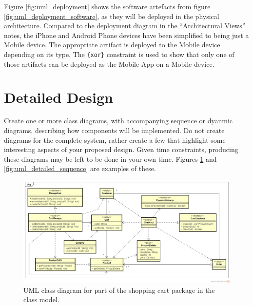 \documentclass{csse4400}
\begin{document}
\noindent
Figure \ref{fig:uml_deployment} shows the software artefacts from figure \ref{fig:uml_deployment_software},
as they will be deployed in the physical architecture.
Compared to the deployment diagram in the ``Architectural Views'' notes,
the iPhone and Android Phone devices have been simplified to being just a Mobile device.
The appropriate artifact is deployed to the Mobile device depending on its type.
The \texttt{\{xor\}} constraint is used to show that only one of those artifacts can be deployed as the Mobile App on a Mobile device.



\filbreak\newpage
\section{Detailed Design}
Create one or more class diagrams, with accompanying sequence or dyanmic diagrams, describing how components will be implemented.
Do not create diagrams for the complete system, rather create a few that highlight some interesting aspects of your proposed design.
Given time constraints, producing these diagrams may be left to be done in your own time.
Figures \ref{fig:uml_class} and \ref{fig:uml_detailed_sequence} are examples of these.

\begin{figure}[h]
    \centering
    \begin{adjustwidth}{-10.5mm}{-11mm}
        \includegraphics[trim=22 45 22 44,clip,width=0.98\paperwidth]{../../notes/views/images/uml/shopping_cart_class_diagram.png}
    \end{adjustwidth}
    \caption{UML class diagram for part of the shopping cart package in the class model.}
    \label{fig:uml_class}
\end{figure}
\end{document}
